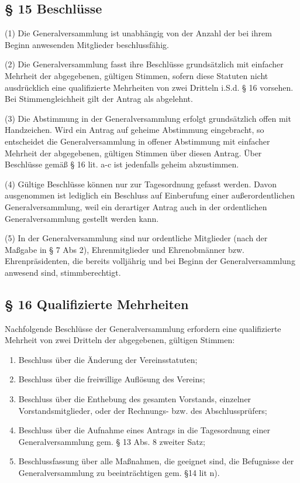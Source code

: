 \documentclass[11pt,a4paper]{article}
\begin{document}
\subsection{§ 15
Beschlüsse}

(1)
Die Generalversammlung ist unabhängig von der Anzahl der bei ihrem Beginn anwesenden Mitglieder beschlussfähig.

(2)
Die Generalversammlung fasst ihre Beschlüsse grundsätzlich mit einfacher Mehrheit der abgegebenen, gültigen Stimmen, sofern diese Statuten nicht ausdrücklich eine qualifizierte Mehrheiten von zwei Dritteln i.S.d. § 16 vorsehen.
Bei Stimmengleichheit gilt der Antrag als abgelehnt.

(3)
Die Abstimmung in der Generalversammlung erfolgt grundsätzlich offen mit Handzeichen.
Wird ein Antrag auf geheime Abstimmung eingebracht, so entscheidet die Generalversammlung in offener Abstimmung mit einfacher Mehrheit der abgegebenen, gültigen Stimmen über diesen Antrag.
Über Beschlüsse gemäß § 16 lit. a-c ist jedenfalls geheim abzustimmen.

(4)
Gültige Beschlüsse können nur zur Tagesordnung gefasst werden.
Davon ausgenommen ist lediglich ein Beschluss auf Einberufung einer außerordentlichen Generalversammlung, weil ein derartiger Antrag auch in der ordentlichen Generalversammlung gestellt werden kann.

(5)
In der Generalversammlung sind nur ordentliche Mitglieder (nach der Maßgabe in § 7 Abs 2), Ehrenmitglieder und Ehrenobmänner bzw. Ehrenpräsidenten, die bereits volljährig und bei Beginn der Generalversammlung anwesend sind, stimmberechtigt.

\subsection{§ 16
Qualifizierte Mehrheiten}

Nachfolgende Beschlüsse der Generalversammlung erfordern eine qualifizierte Mehrheit von zwei Dritteln der abgegebenen, gültigen Stimmen:

\begin{enumerate}[label=\alph*)]
\item
Beschluss über die Änderung der Vereinsstatuten;
\item
Beschluss über die freiwillige Auflösung des Vereins;
\item
Beschluss über die Enthebung des gesamten Vorstands, einzelner Vorstandsmitglieder, oder der Rechnungs- bzw. des Abschlussprüfers;
\item
Beschluss über die Aufnahme eines Antrags in die Tagesordnung einer Generalversammlung gem. § 13 Abs. 8 zweiter Satz;
\item
Beschlussfassung über alle Maßnahmen, die geeignet sind, die Befugnisse der Generalversammlung zu beeinträchtigen gem. §14 lit n).
\end{enumerate}
\end{document}
